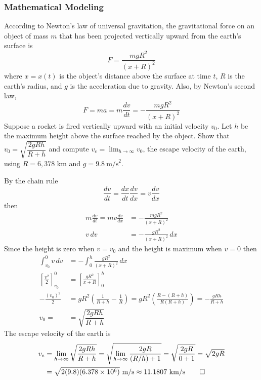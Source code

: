 \subsubsection{Mathematical Modeling}
\begin{problem}
    According to Newton's law of universal gravitation,
    the gravitational force on an object of mass \(m\) that has been
    projected vertically upward from the earth's surface is
    \[F=\frac{mgR^2}{(x+R)^2}\]
    where \(x=x(t)\) is the object's distance
    above the surface at time \(t\), \(R\) is the
    earth's radius, and \(g\) is the acceleration due to gravity.
    Also, by Newton's second law,
    \[F=ma=m\frac{dv}{dt}=-\frac{mgR^2}{(x+R)^2}\]
    Suppose a rocket is fired vertically upward with an initial velocity \(v_0\).
    Let \(h\) be the maximum height above the surface reached by the object.
    Show that \(v_0=\sqrt{\dfrac{2gRh}{R+h}}\) and compute
    \(v_e=\lim_{h\to\infty}v_0\), the escape velocity of the earth, using
    \(R=6,378\) km and \(g=9.8\ \text{m/s}^2\).
\end{problem}
\begin{solution}
    By the chain rule
    \[\frac{dv}{dt}=\frac{dx}{dt}\frac{dv}{dx}=v\frac{dv}{dx}\]
    then
    \begin{align*}
        m\frac{dv}{dt}=mv\frac{dv}{dx} &= -\frac{mgR^2}{(x+R)^2} \\
        v\,dv &= -\frac{gR^2}{(x+R)^2}\,dx
    \end{align*}
    Since the height is zero when \(v=v_0\) and the height is maximum when
    \(v=0\) then
    \begin{align*}
        \int_{v_0}^0 v\,dv &= -\int_0^h \frac{gR^2}{(x+R)^2}\,dx \\
        \left[\frac{v^2}{2}\right]_{v_0}^0
        &= \left[\frac{gR^2}{x+R}\right]_0^h \\
        -\frac{(v_0)^2}{2} &= gR^2\left(\frac{1}{R+h}-\frac{1}{R}\right)
        =gR^2\left(\frac{R-(R+h)}{R(R+h)}\right)=-\frac{gRh}{R+h} \\
        v_0= &= \sqrt{\dfrac{2gRh}{R+h}}
    \end{align*}
    The escape velocity of the earth is
    \begin{align*}
        v_e &= \lim_{h\to\infty}\sqrt{\dfrac{2gRh}{R+h}}
        =\sqrt{\lim_{h\to\infty}\frac{2gR}{(R/h)+1}}=\sqrt{\frac{2gR}{0+1}}
        =\sqrt{2gR} \\
        &=\sqrt{2(9.8)(6.378\times10^6)}\ \text{m/s}
        \approx 11.1807\ \text{km/s} \qedhere
    \end{align*}
\end{solution}